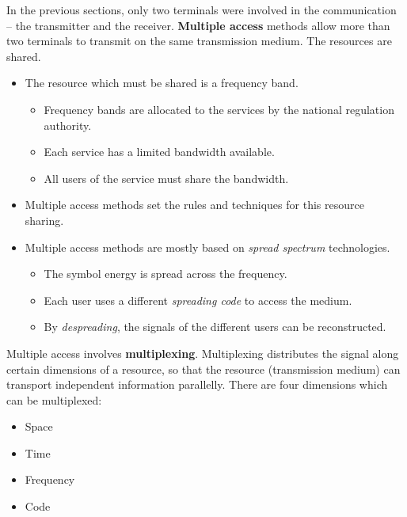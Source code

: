 \begin{refsection}
In the previous sections, only two terminals were involved in the communication -- the transmitter and the receiver.  \textbf{Multiple access} methods allow more than two terminals to transmit on the same transmission medium. The resources are shared.
\begin{itemize}
	\item The resource which must be shared is a frequency band.
	\begin{itemize}
		\item Frequency bands are allocated to the services by the national regulation authority.
		\item Each service has a limited bandwidth available.
		\item All users of the service must share the bandwidth.
	\end{itemize}
	\item Multiple access methods set the rules and techniques for this resource sharing.
	\item Multiple access methods are mostly based on \emph{spread spectrum} technologies.
	\begin{itemize}
		\item The symbol energy is spread across the frequency.
		\item Each user uses a different \emph{spreading code} to access the medium.
		\item By \emph{despreading}, the signals of the different users can be reconstructed.
	\end{itemize}
\end{itemize}

Multiple access involves  \textbf{multiplexing}. Multiplexing distributes the signal along certain dimensions of a resource, so that the resource (transmission medium) can transport independent information parallelly. There are four dimensions which can be multiplexed:
\begin{itemize}
	\item Space
	\item Time
	\item Frequency
	\item Code
\end{itemize}



\end{refsection}
